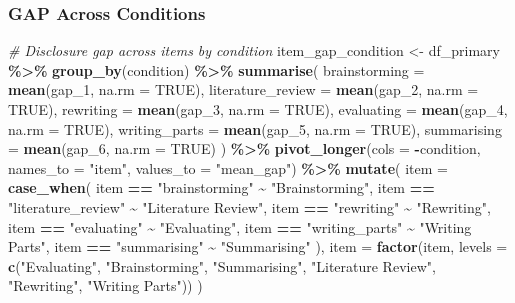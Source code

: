 \documentclass[
]{article}
\newenvironment{Shaded}{\begin{snugshade}}{\end{snugshade}}
\newcommand{\AttributeTok}[1]{\textcolor[rgb]{0.13,0.29,0.53}{#1}}
\newcommand{\CommentTok}[1]{\textcolor[rgb]{0.56,0.35,0.01}{\textit{#1}}}
\newcommand{\ConstantTok}[1]{\textcolor[rgb]{0.56,0.35,0.01}{#1}}
\newcommand{\FunctionTok}[1]{\textcolor[rgb]{0.13,0.29,0.53}{\textbf{#1}}}
\newcommand{\NormalTok}[1]{#1}
\newcommand{\OtherTok}[1]{\textcolor[rgb]{0.56,0.35,0.01}{#1}}
\newcommand{\SpecialCharTok}[1]{\textcolor[rgb]{0.81,0.36,0.00}{\textbf{#1}}}
\newcommand{\StringTok}[1]{\textcolor[rgb]{0.31,0.60,0.02}{#1}}
\begin{document}
\subsubsection{GAP Across Conditions}\label{gap-across-conditions}

\begin{Shaded}
\begin{Highlighting}[]
\CommentTok{\# Disclosure gap across items by condition}
\NormalTok{item\_gap\_condition }\OtherTok{\textless{}{-}}\NormalTok{ df\_primary }\SpecialCharTok{\%\textgreater{}\%}
  \FunctionTok{group\_by}\NormalTok{(condition) }\SpecialCharTok{\%\textgreater{}\%}
  \FunctionTok{summarise}\NormalTok{(}
    \AttributeTok{brainstorming     =} \FunctionTok{mean}\NormalTok{(gap\_1, }\AttributeTok{na.rm =} \ConstantTok{TRUE}\NormalTok{),}
    \AttributeTok{literature\_review =} \FunctionTok{mean}\NormalTok{(gap\_2, }\AttributeTok{na.rm =} \ConstantTok{TRUE}\NormalTok{),}
    \AttributeTok{rewriting         =} \FunctionTok{mean}\NormalTok{(gap\_3, }\AttributeTok{na.rm =} \ConstantTok{TRUE}\NormalTok{),}
    \AttributeTok{evaluating        =} \FunctionTok{mean}\NormalTok{(gap\_4, }\AttributeTok{na.rm =} \ConstantTok{TRUE}\NormalTok{),}
    \AttributeTok{writing\_parts     =} \FunctionTok{mean}\NormalTok{(gap\_5, }\AttributeTok{na.rm =} \ConstantTok{TRUE}\NormalTok{),}
    \AttributeTok{summarising       =} \FunctionTok{mean}\NormalTok{(gap\_6, }\AttributeTok{na.rm =} \ConstantTok{TRUE}\NormalTok{)}
\NormalTok{  ) }\SpecialCharTok{\%\textgreater{}\%}
  \FunctionTok{pivot\_longer}\NormalTok{(}\AttributeTok{cols =} \SpecialCharTok{{-}}\NormalTok{condition,}
               \AttributeTok{names\_to =} \StringTok{"item"}\NormalTok{,}
               \AttributeTok{values\_to =} \StringTok{"mean\_gap"}\NormalTok{) }\SpecialCharTok{\%\textgreater{}\%}
  \FunctionTok{mutate}\NormalTok{(}
    \AttributeTok{item =} \FunctionTok{case\_when}\NormalTok{(}
\NormalTok{      item }\SpecialCharTok{==} \StringTok{"brainstorming"}     \SpecialCharTok{\textasciitilde{}} \StringTok{"Brainstorming"}\NormalTok{,}
\NormalTok{      item }\SpecialCharTok{==} \StringTok{"literature\_review"} \SpecialCharTok{\textasciitilde{}} \StringTok{"Literature Review"}\NormalTok{,}
\NormalTok{      item }\SpecialCharTok{==} \StringTok{"rewriting"}         \SpecialCharTok{\textasciitilde{}} \StringTok{"Rewriting"}\NormalTok{,}
\NormalTok{      item }\SpecialCharTok{==} \StringTok{"evaluating"}        \SpecialCharTok{\textasciitilde{}} \StringTok{"Evaluating"}\NormalTok{,}
\NormalTok{      item }\SpecialCharTok{==} \StringTok{"writing\_parts"}     \SpecialCharTok{\textasciitilde{}} \StringTok{"Writing Parts"}\NormalTok{,}
\NormalTok{      item }\SpecialCharTok{==} \StringTok{"summarising"}       \SpecialCharTok{\textasciitilde{}} \StringTok{"Summarising"}
\NormalTok{    ),}
    \AttributeTok{item =} \FunctionTok{factor}\NormalTok{(item, }\AttributeTok{levels =} \FunctionTok{c}\NormalTok{(}\StringTok{"Evaluating"}\NormalTok{, }\StringTok{"Brainstorming"}\NormalTok{, }
                                    \StringTok{"Summarising"}\NormalTok{, }\StringTok{"Literature Review"}\NormalTok{,}
                                    \StringTok{"Rewriting"}\NormalTok{, }\StringTok{"Writing Parts"}\NormalTok{))}
\NormalTok{  )}


\end{Highlighting}
\end{Shaded}
\end{document}
